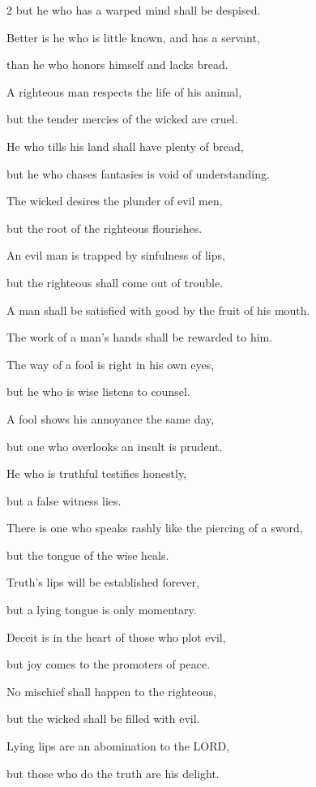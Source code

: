 \begin{multicols}{2}
but he who has a warped mind shall be despised.


\myverse{}Better is he who is little known, and has a servant,

than he who honors himself and lacks bread.


\myverse{}A righteous man respects the life of his animal,

but the tender mercies of the wicked are cruel.


\myverse{}He who tills his land shall have plenty of bread,

but he who chases fantasies is void of understanding.


\myverse{}The wicked desires the plunder of evil men,

but the root of the righteous flourishes.


\myverse{}An evil man is trapped by sinfulness of lips,

but the righteous shall come out of trouble.


\myverse{}A man shall be satisfied with good by the fruit of his mouth.

The work of a man’s hands shall be rewarded to him.


\myverse{}The way of a fool is right in his own eyes,

but he who is wise listens to counsel.


\myverse{}A fool shows his annoyance the same day,

but one who overlooks an insult is prudent.


\myverse{}He who is truthful testifies honestly,

but a false witness lies.


\myverse{}There is one who speaks rashly like the piercing of a sword,

but the tongue of the wise heals.


\myverse{}Truth’s lips will be established forever,

but a lying tongue is only momentary.


\myverse{}Deceit is in the heart of those who plot evil,

but joy comes to the promoters of peace.


\myverse{}No mischief shall happen to the righteous,

but the wicked shall be filled with evil.


\myverse{}Lying lips are an abomination to the LORD,

but those who do the truth are his delight.



\end{multicols}
